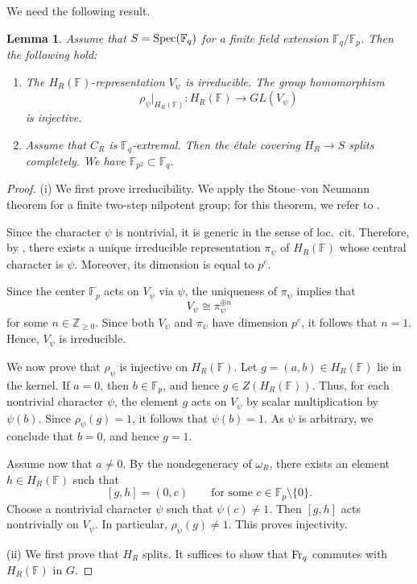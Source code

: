 \documentclass[12pt,a4paper]{amsart}
\newtheorem{lemma}[theorem]{Lemma}
\theoremstyle{definition}
\def\F{{\mathbb F}}
\def\Z{{\mathbb Z}}
\theoremstyle{remark}
\begin{document}
We need the following result. 
\begin{lemma}\label{H_R splits}
    Assume that $S={\rm Spec}(\F_q)$ for a finite field extension $\F_q/\F_p$. Then the following hold: 
    \begin{enumerate}
        \item The $H_R(\F)$-representation $V_\psi$ is irreducible. The group homomorphism 
        \[
        \rho_\psi|_{H_R(\F)}\colon H_R(\F)\to GL(V_\psi)
        \]
is injective. 
\item Assume that $C_R$ is $\F_q$-extremal. Then the \'etale covering $H_R\to S$ splits completely. We have $\F_{p^2}\subset \F_q$. 
    \end{enumerate}
\end{lemma}
\begin{proof}
(i) We first prove irreducibility. We apply the Stone--von Neumann theorem for a finite two-step nilpotent group; for this theorem, we refer to \cite[Exercises~4.1.4--4.1.8]{Bum}. 

Since the character $\psi$ is nontrivial, it is generic in the sense of loc.~cit. Therefore, by \cite[Exercise~4.1.8]{Bum}, there exists a unique irreducible representation $\pi_\psi$ of $H_R(\F)$ whose central character is $\psi$. Moreover, its dimension is equal to $p^e$. 


Since the center $\F_p$ acts on $V_\psi$ via $\psi$,  the uniqueness of $\pi_\psi$ implies that 
\[
V_\psi\cong \pi_\psi^{\oplus n}
\]
 for some $n\in \Z_{\geq0}$. Since both $V_\psi$ and $\pi_\psi$ have dimension $p^e$, it follows that $n=1$. Hence, $V_\psi$ is irreducible. 
 
We now prove that $\rho_\psi$ is injective on $H_R(\F)$. Let $g=(a,b)\in H_R(\F)$ lie in the kernel. If $a=0$, then $b\in \F_p$, and hence $g\in Z(H_R(\F))$. Thus, for each nontrivial character $\psi$, the element  $g$ acts on $V_\psi$ by scalar multiplication by $\psi(b)$. Since $\rho_\psi(g)=1$, it follows that $\psi(b)=1$. As $\psi$ is arbitrary, we conclude that $b=0$, and hence $g=1$.  

Assume now that $a\neq0$. By the nondegeneracy of $\omega_R$, there exists an element $h\in H_R(\F)$ such that 
\[
[g,h]=(0,c)\qquad \text{for some }c\in\F_p\setminus\{0\}. 
\]
Choose a nontrivial character $\psi$ such that $\psi(c)\neq1$. Then $[g,h]$ acts nontrivially on $V_\psi$. In particular, $\rho_\psi(g)\neq1$. This proves injectivity. 

 \medskip 

 \noindent
 (ii) We first prove that $H_R$ splits. It suffices to show that ${\rm Fr}_q$ commutes with $H_R(\F)$ in $G$. 
 

\end{proof}
\end{document}
